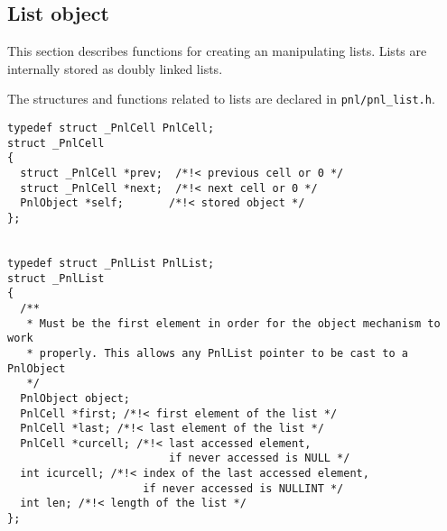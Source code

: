 \subsection{List object}

This section describes functions for creating an manipulating lists. Lists are
internally stored as doubly linked lists.

The structures and functions related to lists are declared in
\verb!pnl/pnl_list.h!.

\begin{verbatim}
typedef struct _PnlCell PnlCell;
struct _PnlCell
{
  struct _PnlCell *prev;  /*!< previous cell or 0 */
  struct _PnlCell *next;  /*!< next cell or 0 */
  PnlObject *self;       /*!< stored object */
};


typedef struct _PnlList PnlList;
struct _PnlList
{
  /**
   * Must be the first element in order for the object mechanism to work
   * properly. This allows any PnlList pointer to be cast to a PnlObject
   */
  PnlObject object; 
  PnlCell *first; /*!< first element of the list */
  PnlCell *last; /*!< last element of the list */
  PnlCell *curcell; /*!< last accessed element,
                         if never accessed is NULL */
  int icurcell; /*!< index of the last accessed element,
                     if never accessed is NULLINT */
  int len; /*!< length of the list */
};
\end{verbatim}

